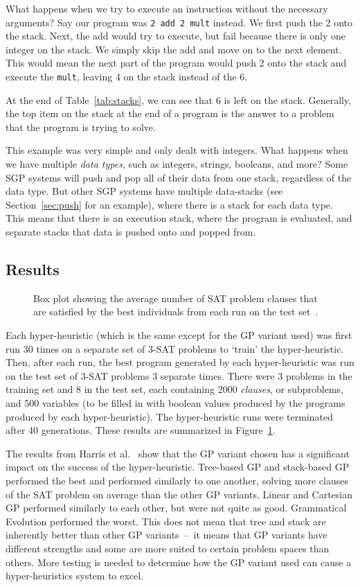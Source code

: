 \documentclass{sig-alternate}
\begin{document}
What happens when we try to execute an instruction without the necessary arguments? Say our program was \texttt{2~add~2~mult} instead. We first push the 2 onto the stack. Next, the add would try to execute, but fail because there is only one integer on the stack. We simply skip the add and move on to the next element. This would mean the next part of the program would push 2 onto the stack and execute the \texttt{mult}, leaving 4 on the stack instead of the 6.

At the end of Table~\ref{tab:stacks}, we can see that 6 is left on the stack. Generally, the top item on the stack at the end of a program is the answer to a problem that the program is trying to solve.

This example was very simple and only dealt with integers. What happens when we have multiple \textit{data types}, such as integers, strings, booleans, and more? Some SGP systems will push and pop all of their data from one stack, regardless of the data type. But other SGP systems have multiple data-stacks (see Section~\ref{sec:push} for an example), where there is a stack for each data type. This means that there is an execution stack, where the program is evaluated, and separate stacks that data is pushed onto and popped from.

\subsection{Results}
\label{sec:gpresults}
\begin{figure}
	\centering
	\caption{Box plot showing the average number of SAT problem clauses that are satisfied by the best individuals from each run on the test set~\cite{harris:2015}.}
	\label{fig:gpvariants}
\end{figure}
Each hyper-heuristic (which is the same except for the GP variant used) was first run 30 times on a separate set of 3-SAT problems to `train' the hyper-heuristic. Then, after each run, the best program generated by each hyper-heuristic was run on the test set of 3-SAT problems 3 separate times. There were 3 problems in the training set and 8 in the test set, each containing 2000 \textit{clauses}, or subproblems, and 500 variables (to be filled in with boolean values produced by the programs produced by each hyper-heuristic). The hyper-heuristic runs were terminated after 40 generations. These results are summarized in Figure~\ref{fig:gpvariants}.

The results from Harris et al.~\cite{harris:2015} show that the GP variant chosen has a significant impact on the success of the hyper-heuristic. Tree-based GP and stack-based GP performed the best and performed similarly to one another, solving more clauses of the SAT problem on average than the other GP variants. Linear and Cartesian GP performed similarly to each other, but were not quite as good. Grammatical Evolution performed the worst. This does not mean that tree and stack are inherently better than other GP variants~--~it means that GP variants have different strengths and some are more suited to certain problem spaces than others. More testing is needed to determine how the GP variant used can cause a hyper-heuristics system to excel.
\end{document}

